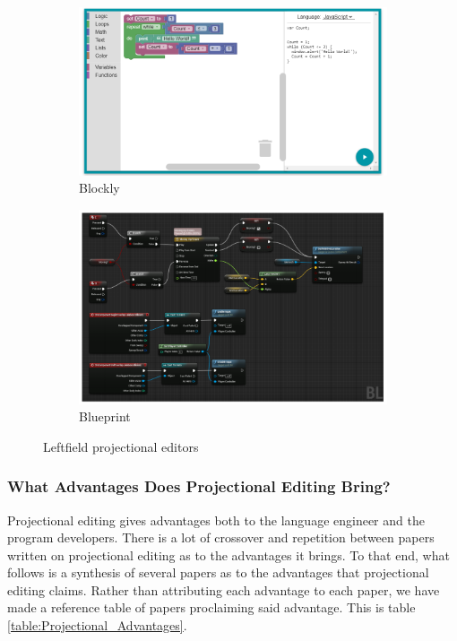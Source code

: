 \begin{figure}[H]
    \begin{subfigure}{.50\textwidth}
      \centering
      \includegraphics[width=.95\linewidth]{Sections/images/blockly.png}
      \caption{Blockly}
      \label{fig:blockly}
    \end{subfigure}%
    \begin{subfigure}{.50\textwidth}
      \centering
      \includegraphics[width=.95\linewidth]{Sections/images/blueprint.png}
      \caption{Blueprint}
      \label{fig:Blueprint}
    \end{subfigure}
    \caption{Leftfield projectional editors}
    \label{fig:leftfield}
\end{figure}

\subsubsection{What Advantages Does Projectional Editing Bring?}

Projectional editing gives advantages both to the language engineer and the program developers.
There is a lot of crossover and repetition between papers written on projectional editing as to the advantages it brings.
To that end, what follows is a synthesis of several papers as to the advantages that projectional editing claims.
Rather than attributing each advantage to each paper, we have made a reference table of papers proclaiming said advantage.
This is table \ref{table:Projectional_Advantages}.

